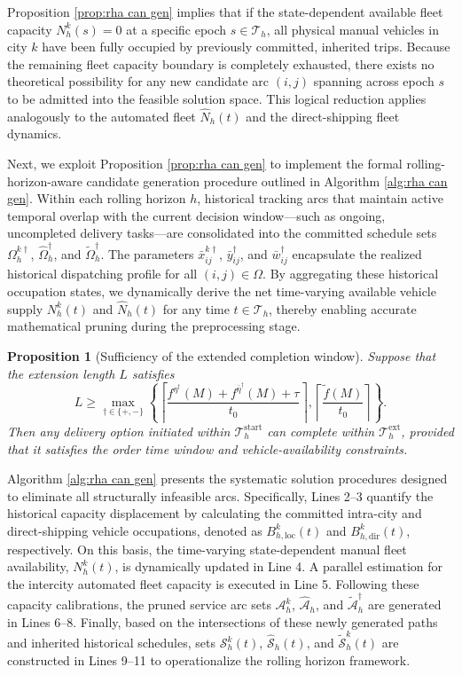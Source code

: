 \documentclass[10pt, reqno]{amsart}
\newtheorem{proposition}[theorem]{Proposition}
\begin{document}
Proposition \ref{prop:rha can gen} implies that if the state-dependent available fleet capacity $N^k_h(s) = 0$ at a specific epoch $s \in \mathcal{T}_h$, all physical manual vehicles in city $k$ have been fully occupied by previously committed, inherited trips. Because the remaining fleet capacity boundary is completely exhausted, there exists no theoretical possibility for any new candidate arc $(i,j)$ spanning across epoch $s$ to be admitted into the feasible solution space. This logical reduction applies analogously to the automated fleet $\widehat{N}_h(t)$ and the direct-shipping fleet dynamics.

Next, we exploit Proposition \ref{prop:rha can gen} to implement the formal rolling-horizon-aware candidate generation procedure outlined in Algorithm \ref{alg:rha can gen}. Within each rolling horizon $h$, historical tracking arcs that maintain active temporal overlap with the current decision window---such as ongoing, uncompleted delivery tasks---are consolidated into the committed schedule sets $\Omega_h^{k\dagger}$, $\widehat{\Omega}_h^\dagger$, and $\widetilde{\Omega}_h^\dagger$. The parameters $\bar{x}_{ij}^{k\dagger}$, $\bar{y}_{ij}^{\dagger}$, and $\bar{w}_{ij}^{\dagger}$ encapsulate the realized historical dispatching profile for all $(i,j) \in \Omega$. By aggregating these historical occupation states, we dynamically derive the net time-varying available vehicle supply $N_h^k(t)$ and $\widehat{N}_h(t)$ for any time $t \in \mathcal{T}_h$, thereby enabling accurate mathematical pruning during the preprocessing stage.
\begin{proposition}[Sufficiency of the extended completion window]
Suppose that the extension length $L$ satisfies
\[
L\ge
\max_{\dagger\in\{+,-\}}
\left\{
\left\lceil 
\frac{f^{\eta^\dagger}(M)+f^{\bar\eta^\dagger}(M)+\tau}{t_0}
\right\rceil,
\left\lceil 
\frac{\widetilde f(M)}{t_0}
\right\rceil
\right\}.
\]
Then any delivery option initiated within $\mathcal T_h^{\mathrm{start}}$ can complete within $\mathcal T_h^{\mathrm{ext}}$, provided that it satisfies the order time window and vehicle-availability constraints.
\end{proposition}
Algorithm \ref{alg:rha can gen} presents the systematic solution procedures designed to eliminate all structurally infeasible arcs. Specifically, Lines 2--3 quantify the historical capacity displacement by calculating the committed intra-city and direct-shipping vehicle occupations, denoted as $B_{h,\mathrm{loc}}^k(t)$ and $B_{h,\mathrm{dir}}^k(t)$, respectively. On this basis, the time-varying state-dependent manual fleet availability, $N^k_h(t)$, is dynamically updated in Line 4. A parallel estimation for the intercity automated fleet capacity is executed in Line 5. Following these capacity calibrations, the pruned service arc sets $\mathcal{A}_h^k$, $\widehat{\mathcal{A}}_h$, and $\widetilde{\mathcal{A}}_h^{\dagger}$ are generated in Lines 6--8. Finally, based on the intersections of these newly generated paths and inherited historical schedules, sets $\mathcal{S}_h^k(t)$, $\widehat{\mathcal{S}}_h(t)$, and $\widetilde{\mathcal{S}}_h^k(t)$ are constructed in Lines 9--11 to operationalize the rolling horizon framework.
\end{document}
